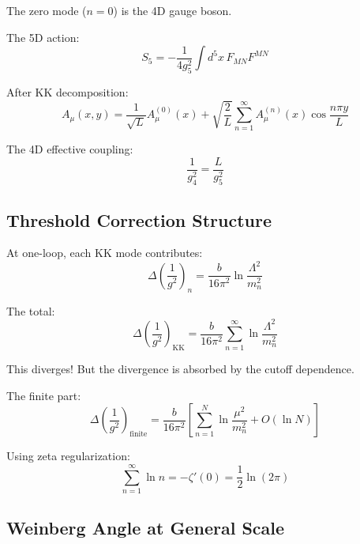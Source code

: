 \documentclass[11pt,a4paper]{article}
\begin{document}
The zero mode ($n=0$) is the 4D gauge boson.

The 5D action:
\begin{equation}
\label{eq:5d-action}
S_5 = -\frac{1}{4g_5^2}\int d^5x\, F_{MN}F^{MN}
\end{equation}

After KK decomposition:
\begin{equation}
\label{eq:kk-decomp}
A_\mu(x,y) = \frac{1}{\sqrt{L}}A_\mu^{(0)}(x) + \sqrt{\frac{2}{L}}\sum_{n=1}^{\infty}A_\mu^{(n)}(x)\cos\frac{n\pi y}{L}
\end{equation}

The 4D effective coupling:
\begin{equation}
\label{eq:4d-coupling-kk}
\frac{1}{g_4^2} = \frac{L}{g_5^2}
\end{equation}

\subsection{Threshold Correction Structure}
\label{subsec:threshold-structure}

At one-loop, each KK mode contributes:
\begin{equation}
\label{eq:kk-one-loop}
\Delta\left(\frac{1}{g^2}\right)_n = \frac{b}{16\pi^2}\ln\frac{\Lambda^2}{m_n^2}
\end{equation}

The total:
\begin{equation}
\label{eq:threshold-total}
\Delta\left(\frac{1}{g^2}\right)_{\text{KK}} = \frac{b}{16\pi^2}\sum_{n=1}^{\infty}\ln\frac{\Lambda^2}{m_n^2}
\end{equation}

This diverges! But the divergence is absorbed by the cutoff dependence.

The finite part:
\begin{equation}
\label{eq:threshold-finite}
\Delta\left(\frac{1}{g^2}\right)_{\text{finite}} = \frac{b}{16\pi^2}\left[\sum_{n=1}^{N}\ln\frac{\mu^2}{m_n^2} + O(\ln N)\right]
\end{equation}

Using zeta regularization:
\begin{equation}
\label{eq:zeta-reg}
\sum_{n=1}^{\infty}\ln n = -\zeta'(0) = \frac{1}{2}\ln(2\pi)
\end{equation}

\subsection{Weinberg Angle at General Scale}
\label{subsec:weinberg-general}
\end{document}
